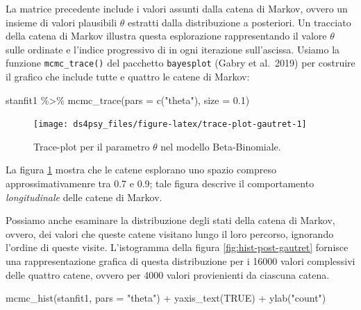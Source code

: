 \documentclass[
  11pt,
]{krantz}
\makeatletter
\newenvironment{Shaded}{\begin{snugshade}}{\end{snugshade}}
\newcommand{\AttributeTok}[1]{\textcolor[rgb]{0.61,0.61,0.61}{#1}}
\newcommand{\ConstantTok}[1]{\textcolor[rgb]{0,0,0}{#1}}
\newcommand{\FloatTok}[1]{\textcolor[rgb]{0.06,0.06,0.06}{#1}}
\newcommand{\FunctionTok}[1]{\textcolor[rgb]{0,0,0}{#1}}
\newcommand{\NormalTok}[1]{#1}
\newcommand{\SpecialCharTok}[1]{\textcolor[rgb]{0,0,0}{#1}}
\newcommand{\StringTok}[1]{\textcolor[rgb]{0.5,0.5,0.5}{#1}}
\newenvironment{kframe}{%
\medskip{}
\setlength{\fboxsep}{.8em}
 \def\at@end@of@kframe{}%
 \ifinner\ifhmode%
  \def\at@end@of@kframe{\end{minipage}}%
  \begin{minipage}{\columnwidth}%
 \fi\fi%
 \def\FrameCommand##1{\hskip\@totalleftmargin \hskip-\fboxsep
 \colorbox{shadecolor}{##1}\hskip-\fboxsep
     \hskip-\linewidth \hskip-\@totalleftmargin \hskip\columnwidth}%
 \MakeFramed {\advance\hsize-\width
   \@totalleftmargin\z@ \linewidth\hsize
   \@setminipage}}%
 {\par\unskip\endMakeFramed%
 \at@end@of@kframe}
\renewenvironment{Shaded}{\begin{kframe}}{\end{kframe}}
\theoremstyle{definition}
\theoremstyle{definition}
\theoremstyle{definition}
\theoremstyle{definition}
\theoremstyle{remark}
\makeatother
\begin{document}
La matrice precedente include i valori assunti dalla catena di Markov, ovvero un insieme di valori plausibili \(\theta\) estratti dalla distribuzione a posteriori. Un tracciato della catena di Markov illustra questa esplorazione rappresentando il valore \(\theta\) sulle ordinate e l'indice progressivo di in ogni iterazione sull'ascissa. Usiamo la funzione \texttt{mcmc\_trace()} del pacchetto \texttt{bayesplot} (Gabry et al.~2019) per costruire il grafico che include tutte e quattro le catene di Markov:

\begin{Shaded}
\begin{Highlighting}[]
\NormalTok{stanfit1 }\SpecialCharTok{\%\textgreater{}\%} 
  \FunctionTok{mcmc\_trace}\NormalTok{(}\AttributeTok{pars =} \FunctionTok{c}\NormalTok{(}\StringTok{"theta"}\NormalTok{), }\AttributeTok{size =} \FloatTok{0.1}\NormalTok{)}
\end{Highlighting}
\end{Shaded}

\begin{figure}[h]

{\centering \texttt{[image: ds4psy\_files/figure-latex/trace-plot-gautret-1]} 

}

\caption{Trace-plot per il parametro $\theta$ nel modello Beta-Binomiale.}\label{fig:trace-plot-gautret}
\end{figure}

La figura \ref{fig:trace-plot-gautret} mostra che le catene esplorano uno spazio compreso approssimativamenre tra 0.7 e 0.9; tale figura descrive il comportamento \emph{longitudinale} delle catene di Markov.

Possiamo anche esaminare la distribuzione degli stati della catena di Markov, ovvero, dei valori che queste catene visitano lungo il loro percorso, ignorando l'ordine di queste visite. L'istogramma della figura \ref{fig:hist-post-gautret} fornisce una rappresentazione grafica di questa distribuzione per i 16000 valori complessivi delle quattro catene, ovvero per 4000 valori provienienti da ciascuna catena.

\begin{Shaded}
\begin{Highlighting}[]
\FunctionTok{mcmc\_hist}\NormalTok{(stanfit1, }\AttributeTok{pars =} \StringTok{"theta"}\NormalTok{) }\SpecialCharTok{+} 
  \FunctionTok{yaxis\_text}\NormalTok{(}\ConstantTok{TRUE}\NormalTok{) }\SpecialCharTok{+} 
  \FunctionTok{ylab}\NormalTok{(}\StringTok{"count"}\NormalTok{)}
\end{Highlighting}
\end{Shaded}
\end{document}
